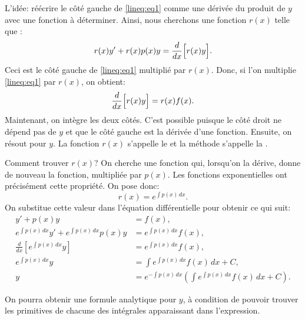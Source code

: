 L'idée: réécrire le côté gauche de  \eqref{lineq:eq1} comme une dérivée du produit de $y$ avec une fonction à déterminer.
Ainsi, nous cherchons une fonction $r(x)$ telle que :
\begin{equation*}
	r(x) y' + r(x) p(x) y = \frac{d}{dx}\Bigl[ r(x) y \Bigr].
\end{equation*}
Ceci est le côté gauche de \eqref{lineq:eq1} multiplié par $r(x)$.
Donc, si l'on multiplie \eqref{lineq:eq1} par $r(x)$, on obtient:
\begin{equation*}
	\frac{d}{dx}\Bigl[ r(x) y \Bigr] = r(x)f(x) .
\end{equation*}
Maintenant, on intègre les deux côtés.
C'est possible puisque le côté droit ne dépend pas de $y$ et que le côté gauche est la dérivée d'une fonction.
Ensuite, on résout pour  $y$.
La fonction $r(x)$ s'appelle le \emph{} et la méthode s'appelle la
\emph{}.

Comment trouver $r(x)$?  On cherche une fonction qui, lorsqu'on la dérive, donne  de nouveau la fonction, multipliée par $p(x)$.
Les fonctions exponentielles ont précisément cette propriété.  On pose donc:
%
\begin{equation*}
r(x) = e^{\int p(x) \,dx} .
\end{equation*}
On substitue cette valeur dans l'équation différentielle pour obtenir ce qui suit:
\begin{align*}
											y' + p(x) y  &= f(x) , \\
	e^{\int p(x) \,dx} y' + e^{\int p(x) \,dx} p(x) y    & = e^{\int p(x) \,dx} f(x) , \\
	\frac{d}{dx}\left[ e^{\int p(x) \,dx} y \right]      & = e^{\int p(x) \,dx} f(x) , \\
									e^{\int p(x) \,dx} y & = \int e^{\int p(x) \,dx} f(x) \,dx + C , \\
													y    & = e^{-\int p(x) \,dx} \left( \int e^{\int p(x) \,dx} f(x) \,dx + C \right) .
\end{align*}

On pourra obtenir une formule analytique pour $y$,
à condition de pouvoir trouver les primitives de chacune des intégrales apparaissant dans l'expression.

